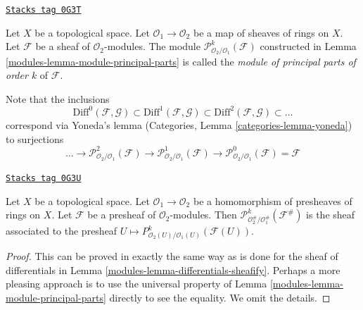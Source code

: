 \begin{definition}
\label{modules-definition-module-principal-parts}
\href{https://stacks.math.columbia.edu/tag/0G3T}{\texttt{Stacks tag 0G3T}}

Let $X$ be a topological space.
Let $\mathcal{O}_1 \to \mathcal{O}_2$ be a map of sheaves of rings on $X$.
Let $\mathcal{F}$ be a sheaf of $\mathcal{O}_2$-modules.
The module $\mathcal{P}^k_{\mathcal{O}_2/\mathcal{O}_1}(\mathcal{F})$
constructed in Lemma \ref{modules-lemma-module-principal-parts}
is called the {\it module of principal parts of order $k$} of $\mathcal{F}$.
\end{definition}

Note that the inclusions
$$
\text{Diff}^0(\mathcal{F}, \mathcal{G}) \subset
\text{Diff}^1(\mathcal{F}, \mathcal{G}) \subset
\text{Diff}^2(\mathcal{F}, \mathcal{G}) \subset \ldots
$$
correspond via Yoneda's lemma (Categories, Lemma \ref{categories-lemma-yoneda})
to surjections
$$
\ldots \to \mathcal{P}^2_{\mathcal{O}_2/\mathcal{O}_1}(\mathcal{F})
\to \mathcal{P}^1_{\mathcal{O}_2/\mathcal{O}_1}(\mathcal{F})
\to \mathcal{P}^0_{\mathcal{O}_2/\mathcal{O}_1}(\mathcal{F}) = \mathcal{F}
$$

\begin{lemma}
\label{modules-lemma-differential-operators-sheafify}
\href{https://stacks.math.columbia.edu/tag/0G3U}{\texttt{Stacks tag 0G3U}}

Let $X$ be a topological space. Let $\mathcal{O}_1 \to \mathcal{O}_2$
be a homomorphism of presheaves of rings on $X$. Let $\mathcal{F}$ be a
presheaf of $\mathcal{O}_2$-modules. Then
$\mathcal{P}^k_{\mathcal{O}_2^\#/\mathcal{O}_1^\#}(\mathcal{F}^\#)$
is the sheaf associated to the presheaf
$U \mapsto P^k_{\mathcal{O}_2(U)/\mathcal{O}_1(U)}(\mathcal{F}(U))$.
\end{lemma}

\begin{proof}

This can be proved in exactly the same way as is done for the sheaf
of differentials in Lemma \ref{modules-lemma-differentials-sheafify}.
Perhaps a more pleasing approach is to use the universal property
of Lemma \ref{modules-lemma-module-principal-parts} directly to see the equality.
We omit the details.
\end{proof}

